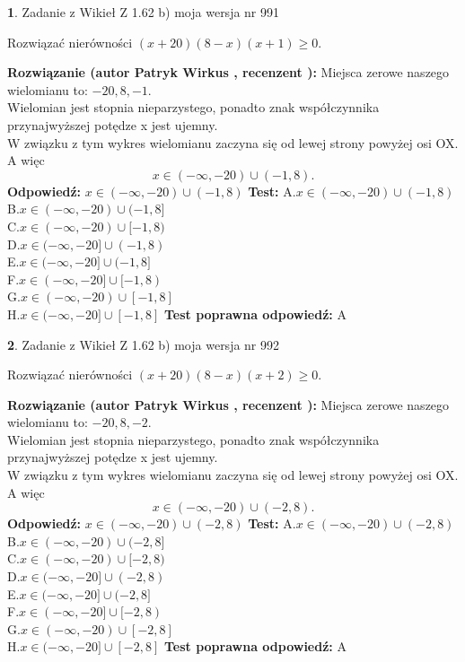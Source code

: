 \documentclass[12pt, a4paper]{article}
\theoremstyle{definition} %
\newtheorem{zad}{}
\newcommand{\zadStart}[1]{\begin{zad}#1\newline}
\newcommand{\zadStop}{\end{zad}}
\newcommand{\rozwStart}[2]{\noindent \textbf{Rozwiązanie (autor #1 , recenzent #2): }\newline}
\newcommand{\rozwStop}{\newline}
\newcommand{\odpStart}{\noindent \textbf{Odpowiedź:}\newline}
\newcommand{\odpStop}{\newline}
\newcommand{\testStart}{\noindent \textbf{Test:}\newline}
\newcommand{\testStop}{\newline}
\newcommand{\kluczStart}{\noindent \textbf{Test poprawna odpowiedź:}\newline}
\newcommand{\kluczStop}{\newline}
\begin{document}
\zadStart{Zadanie z Wikieł Z 1.62 b) moja wersja nr 991}

Rozwiązać nierówności $(x+20)(8-x)(x+1)\ge0$.
\zadStop
\rozwStart{Patryk Wirkus}{}
Miejsca zerowe naszego wielomianu to: $-20, 8, -1$.\\
Wielomian jest stopnia nieparzystego, ponadto znak współczynnika przy\linebreak najwyższej potędze x jest ujemny.\\ W związku z tym wykres wielomianu zaczyna się od lewej strony powyżej osi OX. A więc $$x \in (-\infty,-20) \cup (-1,8).$$
\rozwStop
\odpStart
$x \in (-\infty,-20) \cup (-1,8)$
\odpStop
\testStart
A.$x \in (-\infty,-20) \cup (-1,8)$\\
B.$x \in (-\infty,-20) \cup (-1,8]$\\
C.$x \in (-\infty,-20) \cup [-1,8)$\\
D.$x \in (-\infty,-20] \cup (-1,8)$\\
E.$x \in (-\infty,-20] \cup (-1,8]$\\
F.$x \in (-\infty,-20] \cup [-1,8)$\\
G.$x \in (-\infty,-20) \cup [-1,8]$\\
H.$x \in (-\infty,-20] \cup [-1,8]$
\testStop
\kluczStart
A
\kluczStop



\zadStart{Zadanie z Wikieł Z 1.62 b) moja wersja nr 992}

Rozwiązać nierówności $(x+20)(8-x)(x+2)\ge0$.
\zadStop
\rozwStart{Patryk Wirkus}{}
Miejsca zerowe naszego wielomianu to: $-20, 8, -2$.\\
Wielomian jest stopnia nieparzystego, ponadto znak współczynnika przy\linebreak najwyższej potędze x jest ujemny.\\ W związku z tym wykres wielomianu zaczyna się od lewej strony powyżej osi OX. A więc $$x \in (-\infty,-20) \cup (-2,8).$$
\rozwStop
\odpStart
$x \in (-\infty,-20) \cup (-2,8)$
\odpStop
\testStart
A.$x \in (-\infty,-20) \cup (-2,8)$\\
B.$x \in (-\infty,-20) \cup (-2,8]$\\
C.$x \in (-\infty,-20) \cup [-2,8)$\\
D.$x \in (-\infty,-20] \cup (-2,8)$\\
E.$x \in (-\infty,-20] \cup (-2,8]$\\
F.$x \in (-\infty,-20] \cup [-2,8)$\\
G.$x \in (-\infty,-20) \cup [-2,8]$\\
H.$x \in (-\infty,-20] \cup [-2,8]$
\testStop
\kluczStart
A
\kluczStop
\end{document}
